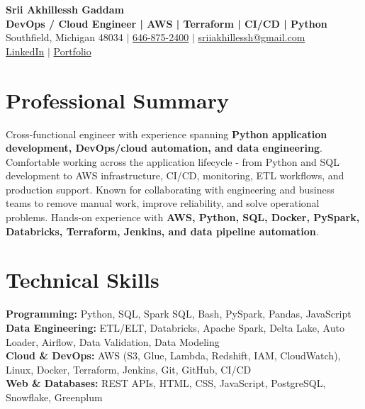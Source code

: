 \documentclass[letterpaper,10pt]{article}
\begin{document}
\fontsize{9.35pt}{10.45pt}\selectfont

\begin{center}
    {\LARGE \textbf{Srii Akhillessh Gaddam}} \\[-1pt]
    \textbf{DevOps / Cloud Engineer | AWS | Terraform | CI/CD | Python} \\[2pt]
    Southfield, Michigan 48034 $|$
    \href{tel:6468752400}{646-875-2400} $|$
    \href{mailto:sriiakhillessh@gmail.com}{sriiakhillessh@gmail.com} \\[1pt]
    \href{https://www.linkedin.com/in/srii-akhiilessh-gaddam-b48668191/}{LinkedIn} $|$
    \href{https://sriiakhillesshg.github.io/portfolio/}{Portfolio}
\end{center}
\vspace{-8pt}

\section{Professional Summary}
\small{Cross-functional engineer with experience spanning \textbf{Python application development, DevOps/cloud automation, and data engineering}. Comfortable working across the application lifecycle - from Python and SQL development to AWS infrastructure, CI/CD, monitoring, ETL workflows, and production support. Known for collaborating with engineering and business teams to remove manual work, improve reliability, and solve operational problems. Hands-on experience with \textbf{AWS, Python, SQL, Docker, PySpark, Databricks, Terraform, Jenkins, and data pipeline automation}.}

\section{Technical Skills}
\small{
\textbf{Programming:} Python, SQL, Spark SQL, Bash, PySpark, Pandas, JavaScript \\
\textbf{Data Engineering:} ETL/ELT, Databricks, Apache Spark, Delta Lake, Auto Loader, Airflow, Data Validation, Data Modeling \\
\textbf{Cloud \& DevOps:} AWS (S3, Glue, Lambda, Redshift, IAM, CloudWatch), Linux, Docker, Terraform, Jenkins, Git, GitHub, CI/CD \\
\textbf{Web \& Databases:} REST APIs, HTML, CSS, JavaScript, PostgreSQL, Snowflake, Greenplum
}
\end{document}
